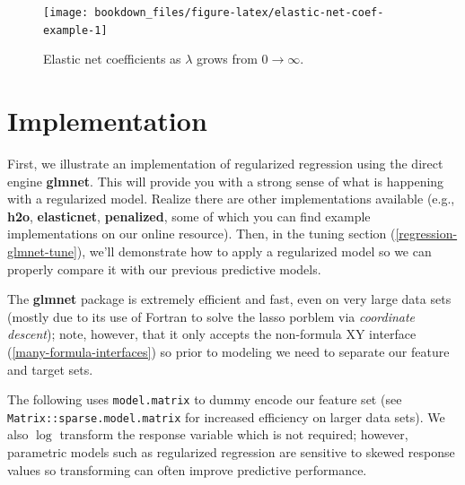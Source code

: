 \documentclass[]{krantz}
\makeatletter
\newenvironment{Shaded}{\begin{snugshade}}{\end{snugshade}}
\newcommand{\CommentTok}[1]{\textcolor[rgb]{0.37,0.37,0.37}{\textit{#1}}}
\newcommand{\DecValTok}[1]{\textcolor[rgb]{0.06,0.06,0.06}{#1}}
\newcommand{\KeywordTok}[1]{\textcolor[rgb]{0.27,0.27,0.27}{\textbf{#1}}}
\newcommand{\NormalTok}[1]{#1}
\newcommand{\OperatorTok}[1]{\textcolor[rgb]{0.43,0.43,0.43}{\textbf{#1}}}
\newcommand{\StringTok}[1]{\textcolor[rgb]{0.5,0.5,0.5}{#1}}
\newenvironment{kframe}{%
\medskip{}
\setlength{\fboxsep}{.8em}
 \def\at@end@of@kframe{}%
 \ifinner\ifhmode%
  \def\at@end@of@kframe{\end{minipage}}%
  \begin{minipage}{\columnwidth}%
 \fi\fi%
 \def\FrameCommand##1{\hskip\@totalleftmargin \hskip-\fboxsep
 \colorbox{shadecolor}{##1}\hskip-\fboxsep
     \hskip-\linewidth \hskip-\@totalleftmargin \hskip\columnwidth}%
 \MakeFramed {\advance\hsize-\width
   \@totalleftmargin\z@ \linewidth\hsize
   \@setminipage}}%
 {\par\unskip\endMakeFramed%
 \at@end@of@kframe}
\newenvironment{block}[1]
  {
  \begin{itemize}
  \renewcommand{\labelitemi}{
    \raisebox{-.7\height}[0pt][0pt]{
      {\setkeys{Gin}{width=3em,keepaspectratio}\texttt{[image: icons/\#1]}}
    }
  }
  \setlength{\fboxsep}{1em}
  \begin{kframe}
  \item
  }
  {
  \end{kframe}
  \end{itemize}
  }
\newenvironment{note}
  {\begin{block}{note}}
  {\end{block}}
\renewenvironment{Shaded}{\begin{kframe}}{\end{kframe}}
\makeatother
\begin{document}
\begin{figure}

{\centering \texttt{[image: bookdown\_files/figure-latex/elastic-net-coef-example-1]} 

}

\caption{Elastic net coefficients as $\lambda$ grows from  $0 \rightarrow \infty$.}\label{fig:elastic-net-coef-example}
\end{figure}

\hypertarget{implementation}{%
\section{Implementation}\label{implementation}}

First, we illustrate an implementation of regularized regression using the direct engine \textbf{glmnet}. This will provide you with a strong sense of what is happening with a regularized model. Realize there are other implementations available (e.g., \textbf{h2o}, \textbf{elasticnet}, \textbf{penalized}, some of which you can find example implementations on our online resource). Then, in the tuning section (\ref{regression-glmnet-tune}), we'll demonstrate how to apply a regularized model so we can properly compare it with our previous predictive models.

The \textbf{glmnet} package is extremely efficient and fast, even on very large data sets (mostly due to its use of Fortran to solve the lasso porblem via \emph{coordinate descent}); note, however, that it only accepts the non-formula XY interface (\ref{many-formula-interfaces}) so prior to modeling we need to separate our feature and target sets.

\begin{note}
The following uses \texttt{model.matrix} to dummy encode our feature set
(see \texttt{Matrix::sparse.model.matrix} for increased efficiency on
larger data sets). We also \(\log\) transform the response variable
which is not required; however, parametric models such as regularized
regression are sensitive to skewed response values so transforming can
often improve predictive performance.
\end{note}

\begin{Shaded}
\end{Shaded}
\end{document}
